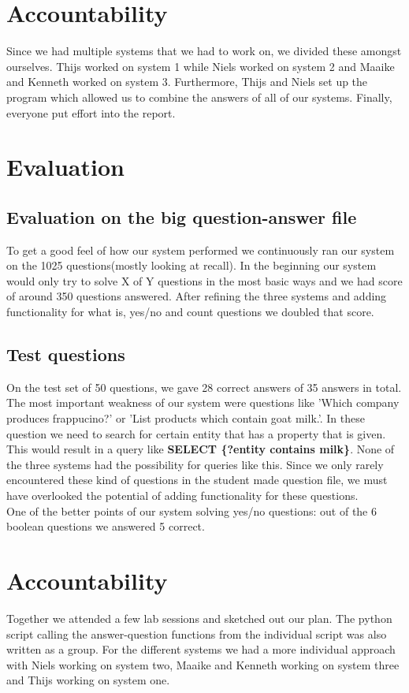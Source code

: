\documentclass{article}
\begin{document}
\section{Accountability}
Since we had multiple systems that we had to work on, we divided these amongst ourselves.
Thijs worked on system 1 while Niels worked on system 2 and Maaike and Kenneth worked on system 3.
Furthermore, Thijs and Niels set up the program which allowed us to combine the answers of all of our systems.
Finally, everyone put effort into the report.

\section*{Evaluation}
\subsection*{Evaluation on the big question-answer file}
To get a good feel of how our system performed we continuously ran our system on the 1025 questions(mostly looking at recall). In the beginning our system would only try to solve X of Y questions in the most basic ways and we had score of around 350 questions answered. After refining the three systems and adding functionality for what is, yes/no and count questions we doubled that score.
\subsection*{Test questions}
On the test set of 50 questions, we gave 28 correct answers of 35 answers in total. The most important weakness of our system were questions like 'Which company produces frappucino?' or 'List products which contain goat milk.'. In these question we need to search for certain entity that has a property that is given. This would result in a query like \textbf{SELECT \{?entity contains milk\}}. None of the three systems had the possibility for queries like this. Since we only rarely encountered these kind of questions in the student made question file, we must have overlooked the potential of adding functionality for these questions.\\
One of the better points of our system solving yes/no questions: out of the 6 boolean questions we answered 5 correct.

\section*{Accountability}
Together we attended a few lab sessions and sketched out our plan. The python script calling the answer-question functions from the individual script was also written as a group. For the different systems we had a more individual approach with Niels working on system two, Maaike and Kenneth working on system three and Thijs working on system one. 
\end{document}
